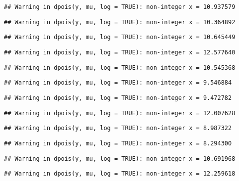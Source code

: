 \documentclass[
]{article}
\begin{document}
\begin{verbatim}
## Warning in dpois(y, mu, log = TRUE): non-integer x = 10.937579
\end{verbatim}

\begin{verbatim}
## Warning in dpois(y, mu, log = TRUE): non-integer x = 10.364892
\end{verbatim}

\begin{verbatim}
## Warning in dpois(y, mu, log = TRUE): non-integer x = 10.645449
\end{verbatim}

\begin{verbatim}
## Warning in dpois(y, mu, log = TRUE): non-integer x = 12.577640
\end{verbatim}

\begin{verbatim}
## Warning in dpois(y, mu, log = TRUE): non-integer x = 10.545368
\end{verbatim}

\begin{verbatim}
## Warning in dpois(y, mu, log = TRUE): non-integer x = 9.546884
\end{verbatim}

\begin{verbatim}
## Warning in dpois(y, mu, log = TRUE): non-integer x = 9.472782
\end{verbatim}

\begin{verbatim}
## Warning in dpois(y, mu, log = TRUE): non-integer x = 12.007628
\end{verbatim}

\begin{verbatim}
## Warning in dpois(y, mu, log = TRUE): non-integer x = 8.987322
\end{verbatim}

\begin{verbatim}
## Warning in dpois(y, mu, log = TRUE): non-integer x = 8.294300
\end{verbatim}

\begin{verbatim}
## Warning in dpois(y, mu, log = TRUE): non-integer x = 10.691968
\end{verbatim}

\begin{verbatim}
## Warning in dpois(y, mu, log = TRUE): non-integer x = 12.259618
\end{verbatim}
\end{document}
